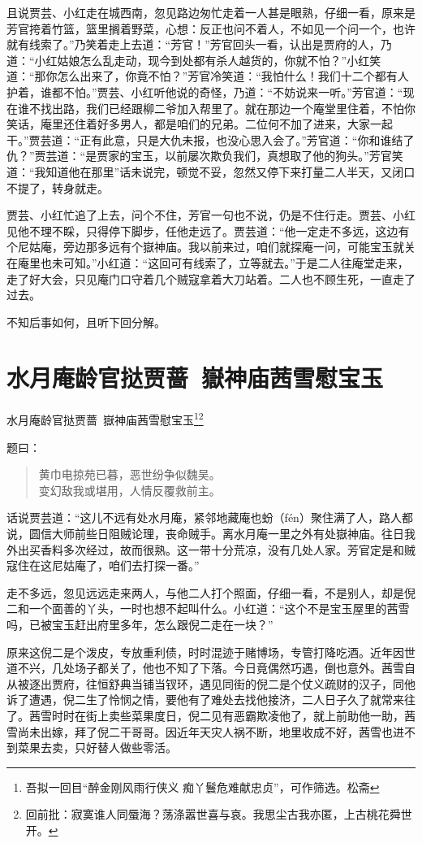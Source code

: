 \documentclass[12pt,oneside]{book}
\newenvironment{shici}{%
\begin{verse}%
\centering\large\hspace{12pt}}%
{\end{verse}}
\begin{document}
且说贾芸、小红走在城西南，忽见路边匆忙走着一人甚是眼熟，仔细一看，原来是芳官挎着竹篮，篮里搁着野菜，心想：反正也问不着人，不如见一个问一个，也许就有线索了。”乃笑着走上去道：“芳官！”芳官回头一看，认出是贾府的人，乃道：“小红姑娘怎么乱走动，现今到处都有杀人越货的，你就不怕？”小红笑道：“那你怎么出来了，你竟不怕？”芳官冷笑道：“我怕什么！我们十二个都有人护着，谁都不怕。”贾芸、小红听他说的奇怪，乃道：“不妨说来一听。”芳官道：“现在谁不找出路，我们已经跟柳二爷加入帮里了。就在那边一个庵堂里住着，不怕你笑话，庵里还住着好多男人，都是咱们的兄弟。二位何不加了进来，大家一起干。”贾芸道：“正有此意，只是大仇未报，也没心思入会了。”芳官道：“你和谁结了仇？”贾芸道：“是贾家的宝玉，以前屡次欺负我们，真想取了他的狗头。”芳官笑道：“我知道他在那里”话未说完，顿觉不妥，忽然又停下来打量二人半天，又闭口不提了，转身就走。

贾芸、小红忙追了上去，问个不住，芳官一句也不说，仍是不住行走。贾芸、小红见他不理不睬，只得停下脚步，任他走远了。贾芸道：“他一定走不多远，这边有个尼姑庵，旁边那多远有个嶽神庙。我以前来过，咱们就探庵一问，可能宝玉就关在庵里也未可知。”小红道：“这回可有线索了，立等就去。”于是二人往庵堂走来，走了好大会，只见庵门口守着几个贼寇拿着大刀站着。二人也不顾生死，一直走了过去。

不知后事如何，且听下回分解。 
 
\chapter{水月庵龄官挞贾蔷~嶽神庙茜雪慰宝玉}
水月庵龄官挞贾蔷~嶽神庙茜雪慰宝玉\footnote{吾拟一回目“醉金刚风雨行侠义 痴丫鬟危难献忠贞”，可作筛选。松斋}\footnote{回前批：寂寞谁人同蜃海？荡涤嚣世喜与哀。我思尘古我亦匿，上古桃花舜世开。}

题曰：
\begin{shici}
黄巾电掠苑已暮，恶世纷争似魏吴。\\
变幻敌我或堪用，人情反覆救前主。
\end{shici}


话说贾芸道：“这儿不远有处水月庵，紧邻地藏庵也蚡（fén）聚住满了人，路人都说，圆信大师前些日阻贼论理，丧命贼手。离水月庵一里之外有处嶽神庙。往日我外出买香料多次经过，故而很熟。这一带十分荒凉，没有几处人家。芳官定是和贼寇住在这尼姑庵了，咱们去打探一番。”

走不多远，忽见远远走来两人，与他二人打个照面，仔细一看，不是别人，却是倪二和一个面善的丫头，一时也想不起叫什么。小红道：“这个不是宝玉屋里的茜雪吗，已被宝玉赶出府里多年，怎么跟倪二走在一块？”

原来这倪二是个泼皮，专放重利债，时时混迹于赌博场，专管打降吃酒。近年因世道不兴，几处场子都关了，他也不知了下落。今日竟偶然巧遇，倒也意外。茜雪自从被逐出贾府，往恒舒典当铺当钗环，遇见同街的倪二是个仗义疏财的汉子，同他诉了遭遇，倪二生了怜悯之情，要他有了难处去找他接济，二人日子久了就常来往了。茜雪时时在街上卖些菜果度日，倪二见有恶霸欺凌他了，就上前助他一助，茜雪尚未出嫁，拜了倪二干哥哥。因近年天灾人祸不断，地里收成不好，茜雪也进不到菜果去卖，只好替人做些零活。
\end{document}
